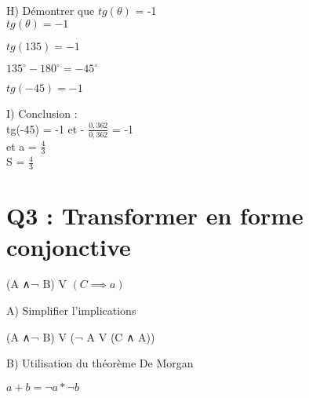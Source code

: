 H) Démontrer que $tg(\theta)$ = -1 \\

$tg(\theta) = -1$ \\
\vspace{5mm} %

$tg(135) = -1$ \\
\vspace{5mm} %

$135^{\circ} -180^{\circ} = -45^{\circ}$ \\
\vspace{5mm} %

$tg(-45) = -1$ \\

\vspace{10mm} %

I) Conclusion : \\

tg(-45) = -1 et - $\frac{0,362}{0,362}$ = -1 \\

et a = $\frac{4}{3}$ \\

S = $\frac{4}{3}$ \\

\newpage

\vspace{10mm} %

\section{Q3 : Transformer en forme conjonctive}

\vspace{4mm} %

(A ∧¬ B) V $(C\implies a)$ \\

\begin{flushleft}
A) Simplifier l’implications \\
\end{flushleft}

  (A ∧¬ B) V (¬ A V (C ∧ A))\\

\begin{flushleft}
B) Utilisation du théorème De Morgan \\
\end{flushleft}

  $a+b = ¬ a * ¬ b$\\

